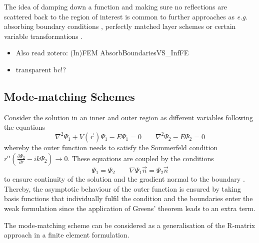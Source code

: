 The idea of damping down a function and making sure no reflections are scattered back to the region of interest is common to further approaches as \textit{e.g.} absorbing boundary conditions \cite{Engquist}, perfectly matched layer schemes \cite{pmlBook,pml1, pml2} or certain variable transformations \cite{taoDVR}.

\begin{itemize}
   \item Also read zotero: (In)FEM AbsorbBoundariesVS\_InfFE
   \item transparent bc!? \cite{HelmhPrec}
\end{itemize}

\subsection{Mode-matching Schemes}
Consider the solution in an inner and outer region as different variables following the equations
\begin{equation}
   \nabla^2\Psi_1 +V(\vec{r})\Psi_1-E\Psi_1=0 \qquad \nabla^2\Psi_2 -E\Psi_2=0 
\end{equation}
whereby the outer function needs to satisfy the Sommerfeld condition $r^\alpha \left(\frac{\partial \Psi_2}{\partial r} - ik \Psi_2  \right)\rightarrow 0$.
These equations are coupled by the conditions
\begin{equation}
\Psi_1=\Psi_2  \qquad \nabla \Psi_1 \vec{n}=\Psi_2 \vec{n}
\end{equation}
to ensure continuity of the solution and the gradient normal to the boundary \cite{AstleyMM}.
Thereby, the asymptotic behaviour of the outer function is ensured by taking basis functions that individually fulfil the condition and the boundaries enter the weak formulation since the application of Greens' theorem leads to an extra term.

The mode-matching scheme can be considered as a generalisation of the R-matrix approach in a finite element formulation.

